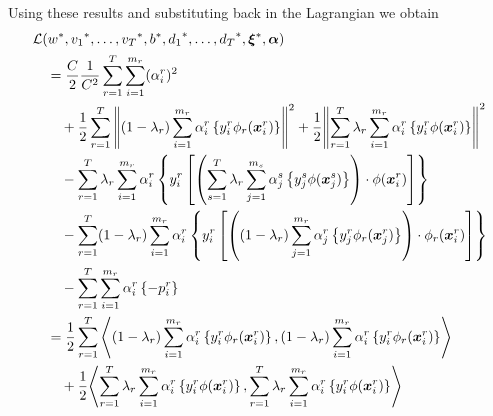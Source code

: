 
Using these results and substituting back in the Lagrangian we obtain
\begin{equation}\nonumber
    \begin{aligned}
         &\lagr(\optim{{w}}, \optim{{v}_1}, \ldots, \optim{{v}_\ntasks}, \optim{b}, \optim{d_1}, \ldots, \optim{d_\ntasks}, \optim{\fv{\xi}}, \fv{\alpha}) \\
        &\quad= \frac{C}{2} \frac{1}{C^2} \sum_{r=1}^\ntasks \sum_{i=1}^{\npertask_r} (\alpha_i^r)^2 \\
        &\qquad +  \frac{1}{2} \sum_{r= 1}^T{\norm{ (1 - \lambda_r) \sum_{i=1}^{m_r}  {\alpha_i^r} \left\lbrace y_i^r \phi_r(\fv{x}_i^r) \right\rbrace}^2} + \frac{1}{2} {\norm{\sum_{r= 1}^T \lambda_r \sum_{i=1}^{m_r} {\alpha_i^r} \left\lbrace y_i^r \phi(\fv{x}_i^r) \right\rbrace}}^2 \\
        &\qquad - \sum_{r= 1}^T \lambda_r \sum_{i=1}^{m_r} \alpha_i^r \left\lbrace y_{i}^r \left[ \left(\sum_{s= 1}^T \lambda_r \sum_{j=1}^{m_s} {\alpha_j^s} \left\lbrace y_j^s \phi(\fv{x}_j^s) \right\rbrace \right) \cdot \phi(\fv{x}_{i}^r) \right]  \right\rbrace \\
        &\qquad -  \sum_{r= 1}^T (1-\lambda_r) \sum_{i=1}^{m_r} \alpha_i^r \left\lbrace y_{i}^r \left[  \left((1-\lambda_r) \sum_{j=1}^{m_r} {\alpha_j^r} \left\lbrace y_j^r \phi_r(\fv{x}_j^r) \right\rbrace \right) \cdot \phi_r(\fv{x}_{i}^r)  \right]  \right\rbrace \\
        &\qquad -  \sum_{r= 1}^T \sum_{i=1}^{m_r} \alpha_i^r \left\lbrace - p_{i}^r  \right\rbrace \\
        &\quad=  \frac{1}{2} \sum_{r= 1}^T{\dotp{(1-\lambda_r)\sum_{i=1}^{m_r} {\alpha_i^r} \left\lbrace y_i^r \phi_r(\fv{x}_i^r) \right\rbrace}{(1-\lambda_r)\sum_{i=1}^{m_r} {\alpha_i^r} \left\lbrace y_i^r \phi_r(\fv{x}_i^r) \right\rbrace}} \\
        &\qquad + \frac{1}{2} {\dotp{\sum_{r= 1}^\ntasks \lambda_r \sum_{i=1}^{m_r} {\alpha_i^r} \left\lbrace y_i^r \phi(\fv{x}_i^r) \right\rbrace}{\sum_{r= 1}^\ntasks \lambda_r \sum_{i=1}^{m_r} {\alpha_i^r} \left\lbrace y_i^r \phi(\fv{x}_i^r) \right\rbrace}} \\

\end{aligned}
\end{equation}
